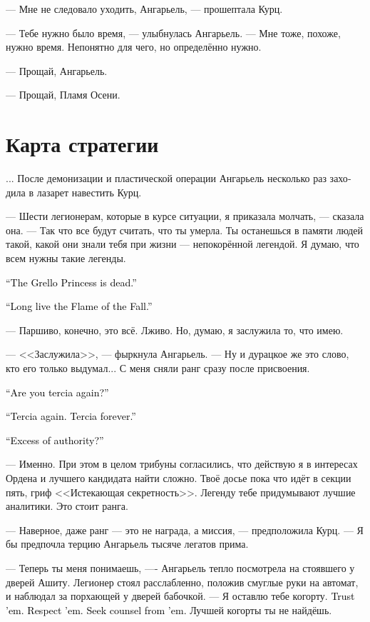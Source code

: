 \documentclass[a4paper,12pt,fleqn]{book}\usepackage{cooltooltips}\usepackage{polyglossia}\setdefaultlanguage[babelshorthands=true]{russian}\setotherlanguage{english}\defaultfontfeatures{Ligatures=TeX,Mapping=tex-text} \usepackage{xcolor}\definecolor{lightgray}{HTML}{bbbbbb}\color{lightgray}\newcommand{\ml}[3]{\textenglish{\textcolor{black}{#3}}}
\begin{document}
--- Мне не следовало уходить, Ангарьель, --- прошептала Курц.

--- Тебе нужно было время, --- улыбнулась Ангарьель.
--- Мне тоже, похоже, нужно время.
Непонятно для чего, но определённо нужно.

--- Прощай, Ангарьель.

--- Прощай, Пламя Осени.

\section{Карта стратегии}

... После демонизации и пластической операции Ангарьель несколько раз заходила в лазарет навестить Курц.

--- Шести легионерам, которые в курсе ситуации, я приказала молчать, --- сказала она.
--- Так что все будут считать, что ты умерла.
Ты останешься в памяти людей такой, какой они знали тебя при жизни --- непокорённой легендой.
Я думаю, что всем нужны такие легенды.

\ml{$0$}
{--- Принцесса греллов мертва.}
{``The Grello Princess is dead.''}

\ml{$0$}
{--- Да здравствует Пламя Осени.}
{``Long live the Flame of the Fall.''}

--- Паршиво, конечно, это всё.
Лживо.
Но, думаю, я заслужила то, что имею.

--- <<Заслужила>>, --- фыркнула Ангарьель.
--- Ну и дурацкое же это слово, кто его только выдумал...
С меня сняли ранг сразу после присвоения.

\ml{$0$}
{--- Ты снова терция?}
{``Are you tercia again?''}

\ml{$0$}
{--- Снова терция.}
{``Tercia again.}
\ml{$0$}
{Вечная терция.}
{Tercia forever.''}

\ml{$0$}
{--- За самоуправство?}
{``Excess of authority?''}

--- Именно.
При этом в целом трибуны согласились, что действую я в интересах Ордена и лучшего кандидата найти сложно.
Твоё досье пока что идёт в секции пять, гриф <<Истекающая секретность>>.
Легенду тебе придумывают лучшие аналитики.
Это стоит ранга.

--- Наверное, даже ранг --- это не награда, а миссия, --- предположила Курц.
--- Я бы предпочла терцию Ангарьель тысяче легатов прима.

--- Теперь ты меня понимаешь, ---- Ангарьель тепло посмотрела на стоявшего у дверей Ашиту.
Легионер стоял расслабленно, положив смуглые руки на автомат, и наблюдал за порхающей у дверей бабочкой.
--- Я оставлю тебе когорту.
\ml{$0$}
{Доверяй им.}
{Trust 'em.}
\ml{$0$}
{Цени их.}
{Respect 'em.}
\ml{$0$}
{Советуйся с ними.}
{Seek counsel from 'em.}
Лучшей когорты ты не найдёшь.
\end{document}
